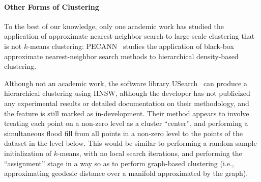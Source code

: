 \paragraph{Other Forms of Clustering}
To the best of our knowledge, only one academic work has studied the application of approximate nearest-neighbor search to large-scale clustering that is not $k$-means clustering:
PECANN~\cite{yu2023pecann,yu2024parallel} studies the application of black-box approximate nearest-neighbor search methods to hierarchical density-based clustering.

Although not an academic work,
the software library USearch~\cite{usearch} can produce a hierarchical clustering using HNSW,
although the developer has not
publicized any experimental results or detailed documentation on their methodology,
and the feature is still marked as in-development.
Their method appears to involve treating each point on a non-zero level as a cluster ``center'',
and performing a simultaneous flood fill from all points in a non-zero level to the points of the dataset in the level below.
This would be similar to performing a random sample initialization of $k$-means, with no local search iterations,
and performing the ``assignment'' stage in a way so as to perform graph-based clustering
(i.e., approximating geodesic distance over a manifold approximated by the graph).

\newpage